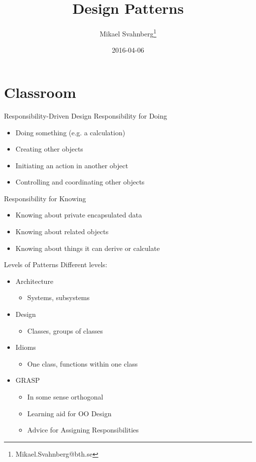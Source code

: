 \documentclass[10pt,t,a4paper]{beamer}
\author{Mikael Svahnberg\thanks{Mikael.Svahnberg@bth.se}}
\date{2016-04-06}
\title{Design Patterns}
\begin{document}
\maketitle

\section{Classroom}
\label{sec-1}
\begin{frame}[label=sec-1-1]{Responsibility-Driven Design}
Responsibility for \alert{Doing}
\begin{itemize}
\item Doing something (e.g. a calculation)
\item Creating other objects
\item Initiating an action in another object
\item Controlling and coordinating other objects
\end{itemize}

Responsibility for \alert{Knowing}
\begin{itemize}
\item Knowing about private encapsulated data
\item Knowing about related objects
\item Knowing about things it can derive or calculate
\end{itemize}
\end{frame}
\begin{frame}[label=sec-1-2]{Levels of Patterns}
Different levels:
\begin{itemize}
\item Architecture
\begin{itemize}
\item Systems, subsystems
\end{itemize}
\item Design
\begin{itemize}
\item Classes, groups of classes
\end{itemize}
\item Idioms
\begin{itemize}
\item One class, functions within one class
\end{itemize}
\item GRASP
\begin{itemize}
\item In some sense orthogonal
\item Learning aid for OO Design
\item Advice for Assigning Responsibilities
\end{itemize}
\end{itemize}
\end{frame}
\end{document}
